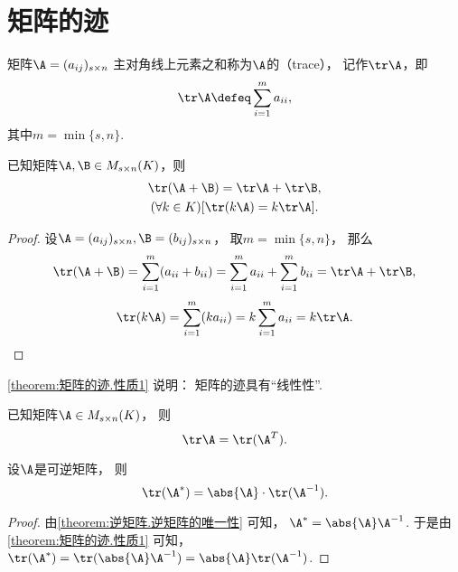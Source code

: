 \section{矩阵的迹}
\begin{definition}
矩阵\(\A=(a_{ij})_{s \times n}\)
主对角线上元素之和称为\(\A\)的（trace），
记作\(\tr\A\)，即\[
	\tr\A \defeq \sum_{i=1}^m a_{ii},
\]
其中\(m = \min\{s,n\}\).
\end{definition}

\begin{property}\label{theorem:矩阵的迹.性质1}
已知矩阵\(\A,\B \in M_{s \times n}(K)\)，则
\begin{gather}
	\tr(\A+\B) = \tr\A + \tr\B, \\
	(\forall k \in K)[\tr(k \A) = k \tr\A].
\end{gather}
\begin{proof}
设\(\A=(a_{ij})_{s \times n},
\B=(b_{ij})_{s \times n}\)，
取\(m = \min\{s,n\}\)，
那么\[
	\tr(\A+\B) = \sum_{i=1}^m (a_{ii}+b_{ii})
	= \sum_{i=1}^m a_{ii}
	+ \sum_{i=1}^m b_{ii}
	= \tr\A + \tr\B,
\]\[
	\tr(k \A) = \sum_{i=1}^m (k a_{ii})
	= k \sum_{i=1}^m a_{ii}
	= k \tr\A.
	\qedhere
\]
\end{proof}
\end{property}
\cref{theorem:矩阵的迹.性质1} 说明：
矩阵的迹具有“线性性”.

\begin{property}\label{theorem:矩阵的迹.性质2}
已知矩阵\(\A \in M_{s \times n}(K)\)，
则\begin{equation}
	\tr\A = \tr(\A^T).
\end{equation}
\end{property}

\begin{property}
设\(\A\)是可逆矩阵，
则\begin{equation}
	\tr(\A^*) = \abs{\A} \cdot \tr(\A^{-1}).
\end{equation}
\begin{proof}
由\cref{theorem:逆矩阵.逆矩阵的唯一性} 可知，
\(\A^* = \abs{\A} \A^{-1}\).
于是由\cref{theorem:矩阵的迹.性质1} 可知，
\(\tr(\A^*) = \tr(\abs{\A} \A^{-1}) = \abs{\A} \tr(\A^{-1})\).
\end{proof}
\end{property}

